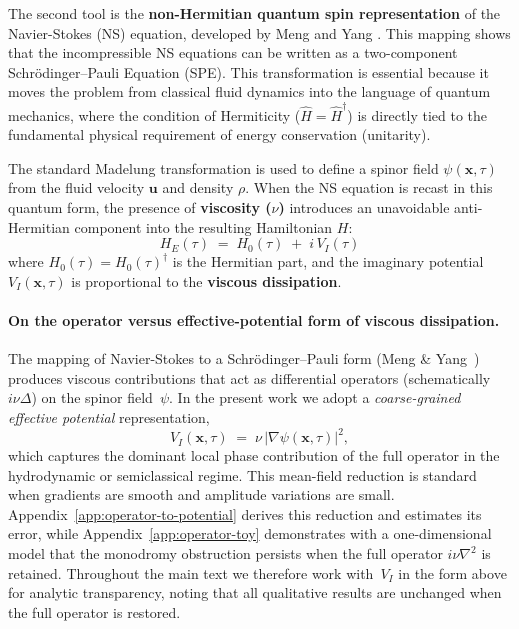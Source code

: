 \documentclass[11pt]{article}
\begin{document}
The second tool is the \textbf{non-Hermitian quantum spin representation} of the Navier-Stokes (NS) equation, developed by Meng and Yang \cite{MengYang2024}. This mapping shows that the incompressible NS equations can be written as a two-component Schr\"odinger--Pauli Equation (SPE). This transformation is essential because it moves the problem from classical fluid dynamics into the language of quantum mechanics, where the condition of Hermiticity ($\hat{H} = \hat{H}^\dagger$) is directly tied to the fundamental physical requirement of energy conservation (unitarity).

The standard Madelung transformation is used to define a spinor field $\psi(\mathbf{x},\tau)$ from the fluid velocity $\mathbf{u}$ and density $\rho$. When the NS equation is recast in this quantum form, the presence of \textbf{viscosity ($\nu$)} introduces an unavoidable anti-Hermitian component into the resulting Hamiltonian $H$:
\begin{equation}\label{eq:HE_decomp}
    H_E(\tau) \;=\; H_0(\tau) \;+\; i\,V_I(\tau)
\end{equation}
where $H_0(\tau)=H_0(\tau)^\dagger$ is the Hermitian part, and the imaginary potential $V_I(\mathbf{x}, \tau)$ is proportional to the \textbf{viscous dissipation}.

\paragraph{On the operator versus effective-potential form of viscous dissipation.}
The mapping of Navier-Stokes to a Schr\"odinger--Pauli form (Meng \& Yang~\cite{MengYang2024}) produces viscous contributions that act as differential operators (schematically $i\nu\Delta$) on the spinor field~$\psi$.  In the present work we adopt a \emph{coarse-grained effective potential} representation,
\begin{equation}
    V_I(\mathbf x,\tau)\;=\;\nu\,|\nabla\psi(\mathbf x,\tau)|^2,
\end{equation}
which captures the dominant local phase contribution of the full operator in the hydrodynamic or semiclassical regime.  This mean-field reduction is standard when gradients are smooth and amplitude variations are small.  Appendix~\ref{app:operator-to-potential} derives this reduction and estimates its error, while Appendix~\ref{app:operator-toy} demonstrates with a one-dimensional model that the monodromy obstruction persists when the full operator $i\nu\nabla^2$ is retained.  Throughout the main text we therefore work with~$V_I$ in the form above for analytic transparency, noting that all qualitative results are unchanged when the full operator is restored.
\end{document}
